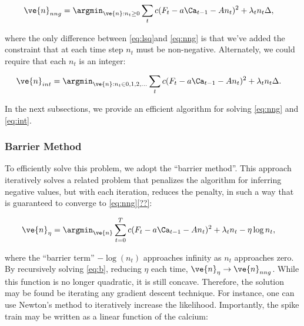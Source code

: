 \documentclass[12pt]{article}
\begin{document}
\begin{align} \label{eq:nng}
\ve{n}_{nng}&= \argmin_{\ve{n}: n_t \geq 0} \sum_t c(F_t - a \Ca_{t-1} - A n_t)^2 + \lambda_t n_t \Delta,
\end{align} 

\noindent where the only difference between \eqref{eq:lsq}and \eqref{eq:nng} is
that we've added the constraint that at each time step $n_t$ must be non-negative. Alternately, we could require that each $n_t$ is an integer:

\begin{align} \label{eq:int}
\ve{n}_{int}&= \argmin_{\ve{n}: n_t \in 0,1,2,\ldots} \sum_t c(F_t - a \Ca_{t-1} - A n_t)^2 + \lambda_t n_t \Delta.
\end{align} 

In the next subsections, we provide an efficient algorithm for solving
\eqref{eq:nng} and \eqref{eq:int}.

\subsubsection{Barrier Method}

To efficiently solve this problem, we adopt the ``barrier method''.  This approach iteratively solves a related problem that penalizes the algorithm for inferring negative values, but with each iteration, reduces the penalty, in such a way that is guaranteed to converge to \eqref{eq:nng}\ref{??}:

\begin{align} \label{eq:b}
\ve{n}_{\eta} &= \argmin_{\ve{n}} \sum_{t=0}^T c (F_t - a \Ca_{t-1} - A n_t)^2  + \lambda_t n_t - \eta \log n_t,
\end{align}

\noindent where the ``barrier term'' $-\log(n_t)$ approaches infinity as $n_t$ approaches zero. By recursively solving \eqref{eq:b}, reducing $\eta$ each time, $\ve{n}_{\eta} \rightarrow \ve{n}_{nng}$. While this function is no longer quadratic, it is still concave. Therefore, the solution may be found be iterating any gradient descent technique.  For instance, one can use Newton's method to iteratively increase the likelihood.  Importantly, the spike train may be written as a linear function of the calcium:
\end{document}
